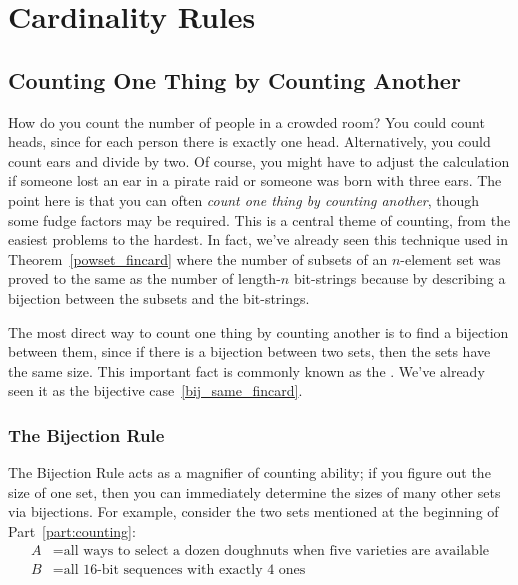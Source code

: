 \chapter{Cardinality Rules}\label{counting_chap}

\newcommand{\Jay}{Ali}
\newcommand{\Jer}{Oscar}

\section{Counting One Thing by Counting Another}\label{bijection_counting_sec}

How do you count the number of people in a crowded room?  You could
count heads, since for each person there is exactly one head.
Alternatively, you could count ears and divide by two.  Of course, you
might have to adjust the calculation if someone lost an ear in a
pirate raid or someone was born with three ears.  The point here is
that you can often \emph{count one thing by counting another}, though
some fudge factors may be required.  This is a central theme of
counting, from the easiest problems to the hardest.  In fact, we've
already seen this technique used in Theorem~\ref{powset_fincard} where
the number of subsets of an $n$-element set was proved to the same as
the number of length-$n$ bit-strings because by describing a bijection
between the subsets and the bit-strings.

The most direct way to count one thing by counting another is to find
a bijection between them, since if there is a bijection between two
sets, then the sets have the same size.  This important fact is
commonly known as the .  We've already seen it as
the  bijective case~\eqref{bij_same_fincard}.

\subsection{The Bijection Rule}

\iffalse
\begin{rul}[Bijection Rule]\label{rul:bijection}
If there is a bijection $f: A \to B$ between $A$ and~$B$, then
$\card{A} = \card{B}$.
\end{rul}
\fi

The Bijection Rule acts as a magnifier of counting ability; if you
figure out the size of one set, then you can immediately determine the
sizes of many other sets via bijections.  For example, consider the
two sets mentioned at the beginning of Part~\ref{part:counting}:
%
\begin{align*}
A & = \text{all ways to select a dozen doughnuts when five varieties are available} \\
B & = \text{all 16-bit sequences with exactly 4 ones}
\end{align*}

